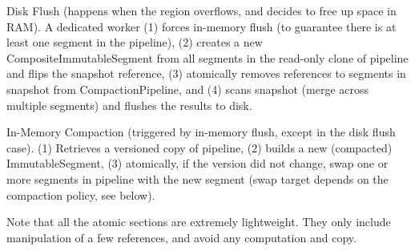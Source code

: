 Disk Flush (happens when the region overflows, and decides to free up space in RAM). A dedicated worker (1) forces in-memory flush (to guarantee there is at least one segment in the pipeline), (2) creates a new CompositeImmutableSegment from all segments in the read-only clone of pipeline and flips the snapshot reference, (3) atomically removes references to segments in snapshot from CompactionPipeline, and (4) scans snapshot (merge across multiple segments) and flushes the results to disk. 

In-Memory Compaction (triggered by in-memory flush, except in the disk flush case). (1) Retrieves a versioned copy of pipeline, (2) builds a new (compacted) ImmutableSegment, (3) atomically, if the version did not change, swap one or more segments in pipeline with the new segment (swap target depends on the compaction policy, see below). 

Note that all the atomic sections are extremely lightweight. They only include manipulation of a few references, and avoid any computation and copy. 
